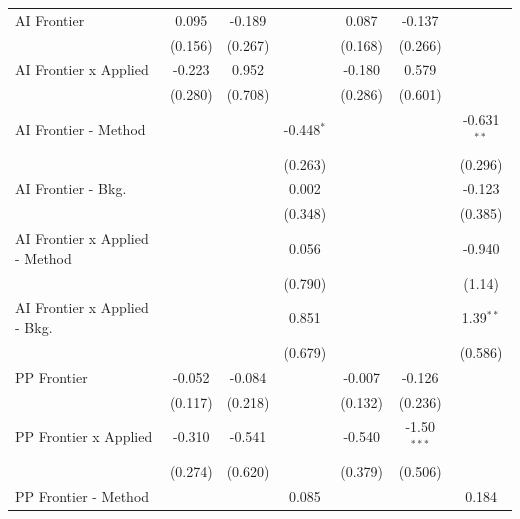 \begin{tabular}{lcccccc}
   AI Frontier                    & 0.095       & -0.189  &              & 0.087         & -0.137        &   \\   
                                  & (0.156)     & (0.267) &              & (0.168)       & (0.266)       &   \\   
   AI Frontier x Applied          & -0.223      & 0.952   &              & -0.180        & 0.579         &   \\   
                                  & (0.280)     & (0.708) &              & (0.286)       & (0.601)       &   \\   
   AI Frontier - Method           &             &         & -0.448$^{*}$ &               &               & -0.631$^{**}$\\   
                                  &             &         & (0.263)      &               &               & (0.296)\\   
   AI Frontier - Bkg.             &             &         & 0.002        &               &               & -0.123\\   
                                  &             &         & (0.348)      &               &               & (0.385)\\   
   AI Frontier x Applied - Method &             &         & 0.056        &               &               & -0.940\\   
                                  &             &         & (0.790)      &               &               & (1.14)\\   
   AI Frontier x Applied - Bkg.   &             &         & 0.851        &               &               & 1.39$^{**}$\\   
                                  &             &         & (0.679)      &               &               & (0.586)\\   
   PP Frontier                    & -0.052      & -0.084  &              & -0.007        & -0.126        &   \\   
                                  & (0.117)     & (0.218) &              & (0.132)       & (0.236)       &   \\   
   PP Frontier x Applied          & -0.310      & -0.541  &              & -0.540        & -1.50$^{***}$ &   \\   
                                  & (0.274)     & (0.620) &              & (0.379)       & (0.506)       &   \\   
   PP Frontier - Method           &             &         & 0.085        &               &               & 0.184\\   

\end{tabular}
